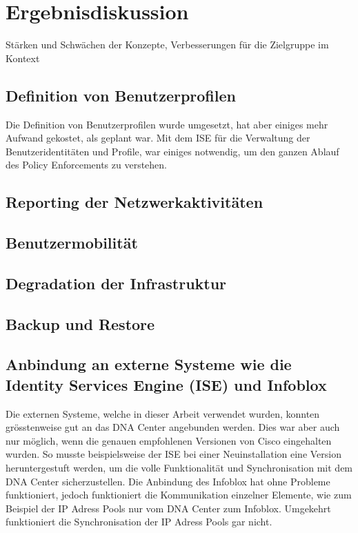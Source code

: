 \section{Ergebnisdiskussion}
Stärken und Schwächen der Konzepte, Verbesserungen für die Zielgruppe im Kontext





\subsection{Definition von Benutzerprofilen}
Die Definition von Benutzerprofilen wurde umgesetzt, hat aber einiges mehr Aufwand gekostet, als geplant war. Mit dem ISE für die Verwaltung der Benutzeridentitäten und Profile, war einiges notwendig, um den ganzen Ablauf des Policy Enforcements zu verstehen.



\subsection{Reporting der Netzwerkaktivitäten}


\subsection{Benutzermobilität}


\subsection{Degradation der Infrastruktur}


\subsection{Backup und Restore}


\subsection{Anbindung an externe Systeme wie die Identity Services Engine (ISE) und Infoblox}
Die externen Systeme, welche in dieser Arbeit verwendet wurden, konnten grösstenweise gut an das DNA Center angebunden werden. Dies war aber auch nur möglich, wenn die genauen empfohlenen Versionen von Cisco eingehalten wurden. So musste beispielsweise der ISE bei einer Neuinstallation eine Version heruntergestuft werden, um die volle Funktionalität und Synchronisation mit dem DNA Center sicherzustellen. Die Anbindung des Infoblox hat ohne Probleme funktioniert, jedoch funktioniert die Kommunikation einzelner Elemente, wie zum Beispiel der IP Adress Pools nur vom DNA Center zum Infoblox. Umgekehrt funktioniert die Synchronisation der IP Adress Pools gar nicht. 





